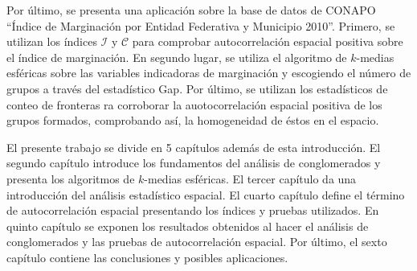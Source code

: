 Por último, se presenta una aplicación sobre la base de datos de CONAPO ``Índice de Marginación por Entidad Federativa y Municipio 2010''. Primero, se utilizan los índices $\mathcal{I}$ y $\mathcal{C}$ para comprobar autocorrelación espacial positiva sobre el índice de marginación. En segundo lugar, se utiliza el algoritmo de $k$-medias esféricas sobre las variables indicadoras de marginación y escogiendo el número de grupos a través del estadístico Gap. Por último, se utilizan los estadísticos de conteo de fronteras ra corroborar la auotocorrelación espacial positiva de los grupos formados, comprobando así, la homogeneidad de éstos en el espacio.

El presente trabajo se divide en 5 capítulos además de esta introducción. El segundo capítulo introduce los fundamentos del análisis de conglomerados y presenta los algoritmos de $k$-medias esféricas. El tercer capítulo da una introducción del análisis estadístico espacial. El cuarto capítulo define el término de autocorrelación espacial presentando los índices y pruebas utilizados. En quinto capítulo se exponen los resultados obtenidos al hacer el análisis de conglomerados y las pruebas de autocorrelación espacial. Por último, el sexto capítulo contiene las conclusiones y posibles aplicaciones.